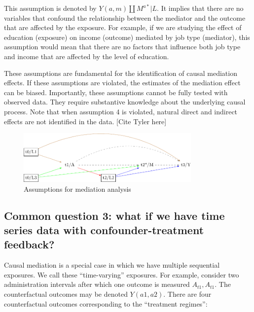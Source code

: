 \documentclass[
  singlecolumn]{report}
\begin{document}
This assumption is denoted by \(Y(a,m) \coprod M^{a*} | L\). It implies
that there are no variables that confound the relationship between the
mediator and the outcome that are affected by the exposure. For example,
if we are studying the effect of education (exposure) on income
(outcome) mediated by job type (mediator), this assumption would mean
that there are no factors that influence both job type and income that
are affected by the level of education.

These assumptions are fundamental for the identification of causal
mediation effects. If these assumptions are violated, the estimates of
the mediation effect can be biased. Importantly, these assumptions
cannot be fully tested with observed data. They require substantive
knowledge about the underlying causal process. Note that when assumption
4 is violated, natural direct and indirect effects are not identified in
the data. {[}Cite Tyler here{]}

\begin{figure}

{\centering \includegraphics[width=0.8\textwidth,height=\textheight]{causal-dags_files/figure-pdf/fig-dag-mediation-assuptions-1.pdf}

}

\caption{\label{fig-dag-mediation-assuptions}Assumptions for mediation
analysis}

\end{figure}

\hypertarget{common-question-3-what-if-we-have-time-series-data-with-confounder-treatment-feedback}{%
\subsection{Common question 3: what if we have time series data with
confounder-treatment
feedback?}\label{common-question-3-what-if-we-have-time-series-data-with-confounder-treatment-feedback}}

Causal mediation is a special case in which we have multiple sequential
exposures. We call these ``time-varying'' exposures. For example,
consider two administration intervals after which one outcome is
measured \(A_{t1}, A_{t1}\). The counterfactual outcomes may be denoted
\(Y(a1,a2)\). There are four counterfactual outcomes corresponding to
the ``treatment regimes'':
\end{document}
